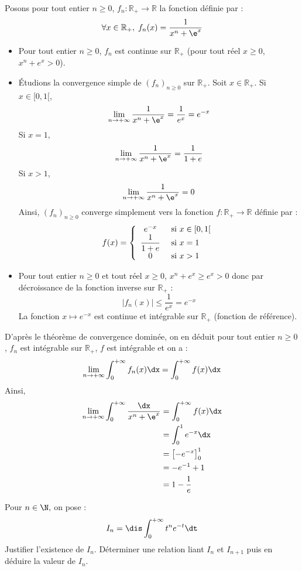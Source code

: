 \documentclass[a4paper,10pt]{report}
\begin{document}
 \corr Posons pour tout entier $n \geq 0$, $f_n : \mathbb{R}_+ \rightarrow \mathbb{R}$ la fonction définie par :
 $$ \forall x \in \mathbb{R}_+, \; f_n(x) = \frac{1}{x^{n} + \e^{x}}$$
 
 \begin{itemize}
 \item Pour tout entier $n \geq 0$, $f_n$ est continue sur $\mathbb{R}_+$ (pour tout réel $x \geq 0$, $x^n+e^x>0$).
 \item Étudions la convergence simple de $(f_n)_{n \geq 0}$ sur $\mathbb{R}_+$. Soit $x \in \mathbb{R}_+$. Si $x \in [0,1[$,
 $$ \lim_{n \rightarrow + \infty} \frac{1}{x^{n} + \e^{x}} = \dfrac{1}{e^x} = e^{-x}$$
 Si $x=1$,
 $$ \lim_{n \rightarrow + \infty} \frac{1}{x^{n} + \e^{x}} = \dfrac{1}{1+e}$$
 Si $x>1$,
 $$  \lim_{n \rightarrow + \infty} \frac{1}{x^{n} + \e^{x}} = 0$$
 Ainsi, $(f_n)_{n \geq 0}$ converge simplement vers la fonction $f: \mathbb{R}_+ \rightarrow \mathbb{R}$ définie par :
 $$ f(x) = \left\lbrace \begin{array}{cl}
 e^{-x} & \hbox{ si } x \in [0,1[ \\
  \dfrac{1}{1+e} & \hbox{ si } x = 1 \\
  0 & \hbox{ si } x>1
 \end{array}\right.$$
 \item Pour tout entier $n \geq 0$ et tout réel $x \geq 0$, $x^n+e^x \geq e^x>0$ donc par décroissance de la fonction inverse sur $\mathbb{R}_+$ :
 $$ \vert f_n(x) \vert \leq \dfrac{1}{e^x}=e^{-x}$$
La fonction $x \mapsto e^{-x}$ est continue et intégrable sur $\mathbb{R}_+$ (fonction de référence).
 \end{itemize}
D'après le théorème de convergence dominée, on en déduit pour tout entier $n \geq 0$, $f_n$ est intégrable sur $\mathbb{R}_+$, $f$ est intégrable et on a :
$$ \lim_{n \rightarrow + \infty} \int_0^{+ \infty} f_n(x) \dx = \int_0^{+ \infty} f(x) \dx$$
Ainsi,
\begin{align*}
\lim_{n \rightarrow + \infty} \int_{0}^{ + \infty} \frac{\dx}{x^{n} + \e^{x}} & = \int_0^{+ \infty} f(x) \dx \\
& = \int_0^1 e^{-x} \dx \\
& = \left[ -e^{-x} \right]_0^1 \\
& = -e^{-1}+ 1 \\
& = 1 - \dfrac{1}{e}
\end{align*}

\begin{Exercice}{} Pour $n\in\N,$ on pose :
$$I_n=\dis\int_0^{+\infty} t^ne^{-t} \dt$$
Justifier l'existence de $I_n$. D\'eterminer une relation liant $I_n$ et $I_{n+1}$ puis en d\'eduire la valeur de $I_n.$
\end{Exercice} 
\end{document}
